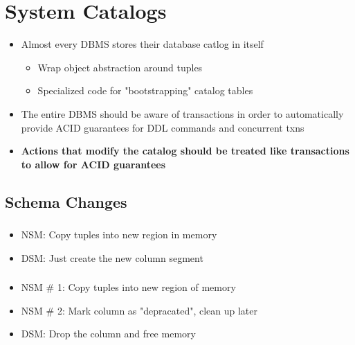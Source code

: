 \documentclass[11pt]{article}
\begin{document}
\maketitle
\thispagestyle{plain}

\section{System Catalogs}
    \begin{itemize}
        \item Almost every DBMS stores their database catlog in itself
        \begin{itemize}
            \item Wrap object abstraction around tuples
            \item Specialized code for "bootstrapping" catalog tables
        \end{itemize}
        \item The entire DBMS should be aware of transactions in order to automatically provide ACID guarantees for DDL commands and concurrent txns
        \item \textbf{Actions that modify the catalog should be treated like transactions to allow for ACID guarantees}
    \end{itemize}

    \subsection*{\textbf{Schema Changes}}

        \subsubsection*{}
        \begin{itemize}
            \item NSM: Copy tuples into new region in memory
            \item DSM: Just create the new column segment
        \end{itemize}
        \subsubsection*{}
        \begin{itemize}
            \item NSM \# 1: Copy tuples into new region of memory
            \item NSM \# 2: Mark column as "depracated", clean up later
            \item DSM: Drop the column and free memory
        \end{itemize}
\end{document}
